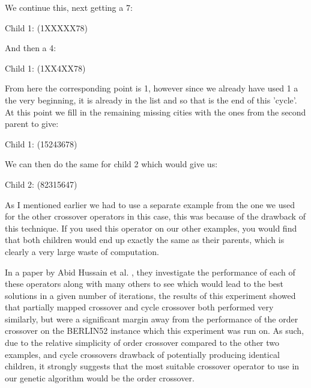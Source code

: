 \documentclass[11pt,a4paper,titlepage]{article}
\begin{document}
We continue this, next getting a 7:

\begin{center}\Large
Child 1: (1XXXXX78)\\
\end{center}

And then a 4:

\begin{center}\Large
Child 1: (1XX4XX78)\\
\end{center}

From here the corresponding point is 1, however since we already have used 1 a the very beginning, it is already in the list and so that is the end of this 'cycle'. At this point we fill in the remaining missing cities with the ones from the second parent to give:

 \begin{center}\Large
Child 1: (15243678)\\
\end{center}

We can then do the same for child 2 which would give us:

\begin{center}\Large
Child 2: (82315647)\\
\end{center}

As I mentioned earlier we had to use a separate example from the one we used for the other crossover operators in this case, this was because of the drawback of this technique. If you used this operator on our other examples, you would find that both children would end up exactly the same as their parents, which is clearly a very large waste of computation.

In a paper by Abid Hussain et al. \cite{GACrossoverPerformance}, they investigate the performance of each of these operators along with many others to see which would lead to the best solutions in a given number of iterations, the results of this experiment showed that partially mapped crossover and cycle crossover both performed very similarly, but were a significant margin away from the performance of the order crossover on the BERLIN52 instance which this experiment was run on. As such, due to the relative simplicity of order crossover compared to the other two examples, and cycle crossovers drawback of potentially producing identical children, it strongly suggests that the most suitable crossover operator to use in our genetic algorithm would be the order crossover.
\end{document}
